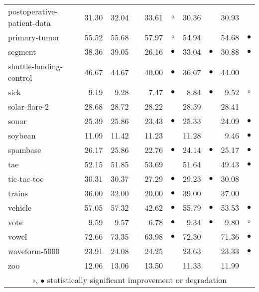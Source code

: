 {\begin{longtable}{lrr@{\hspace{0.1cm}}cr@{\hspace{0.1cm}}cr@{\hspace{0.1cm}}cr@{\hspace{0.1cm}}c}
postoperative-patient-data & 31.30 & 32.04 &           & 33.61 &   $\circ$ & 30.36 &           & 30.93 &          \\
primary-tumor & 55.52 & 55.68 &           & 57.97 &   $\circ$ & 54.94 &           & 54.68 & $\bullet$\\
segment & 38.36 & 39.05 &           & 26.16 & $\bullet$ & 33.04 & $\bullet$ & 30.88 & $\bullet$\\
shuttle-landing-control & 46.67 & 44.67 &           & 40.00 & $\bullet$ & 36.67 & $\bullet$ & 44.00 &          \\
sick &  9.19 &  9.28 &           &  7.47 & $\bullet$ &  8.84 & $\bullet$ &  9.52 &   $\circ$\\
solar-flare-2 & 28.68 & 28.72 &           & 28.22 &           & 28.39 &           & 28.41 &          \\
sonar & 25.39 & 25.86 &           & 23.43 & $\bullet$ & 25.33 &           & 24.09 & $\bullet$\\
soybean & 11.09 & 11.42 &           & 11.23 &           & 11.28 &           &  9.46 & $\bullet$\\
spambase & 26.17 & 25.86 &           & 22.76 & $\bullet$ & 24.14 & $\bullet$ & 25.17 & $\bullet$\\
tae & 52.15 & 51.85 &           & 53.69 &           & 51.64 &           & 49.43 & $\bullet$\\
tic-tac-toe & 30.31 & 30.37 &           & 27.29 & $\bullet$ & 29.23 & $\bullet$ & 30.08 &          \\
trains & 36.00 & 32.00 &           & 20.00 & $\bullet$ & 39.00 &           & 37.00 &          \\
vehicle & 57.05 & 57.32 &           & 42.62 & $\bullet$ & 55.79 & $\bullet$ & 53.53 & $\bullet$\\
vote &  9.59 &  9.57 &           &  6.78 & $\bullet$ &  9.34 & $\bullet$ &  9.80 &   $\circ$\\
vowel & 72.66 & 73.35 &           & 63.98 & $\bullet$ & 72.30 &           & 71.36 & $\bullet$\\
waveform-5000 & 23.91 & 24.08 &           & 24.25 &           & 23.63 &           & 23.33 & $\bullet$\\
zoo & 12.06 & 13.06 &           & 13.50 &           & 11.33 &           & 11.99 &          \\
\hline
\multicolumn{10}{c}{$\circ$, $\bullet$ statistically significant improvement or degradation}\\
\end{longtable} \footnotesize \par}